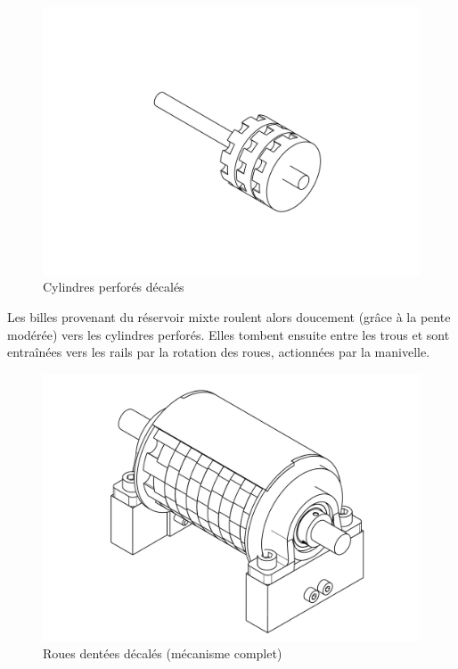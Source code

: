 \begin{figure}
    \centering
    \includegraphics[width=\textwidth]{Graphics/Roue/DRAWING_ROUES_DENTEES_DECALES.pdf}
    \caption{Cylindres perforés décalés}
\end{figure}

Les billes provenant du réservoir mixte roulent alors doucement (grâce à la pente modérée)  vers les cylindres perforés. Elles tombent ensuite entre les trous et sont entraînées vers les rails par la rotation des roues, actionnées par la manivelle.

\begin{figure}
    \centering
    \includegraphics[width=\textwidth]{Graphics/Roue/DRAWING_COUVERCLE_COMPLET.pdf}
    \caption{Roues dentées décalés (mécanisme complet)}
\end{figure}

